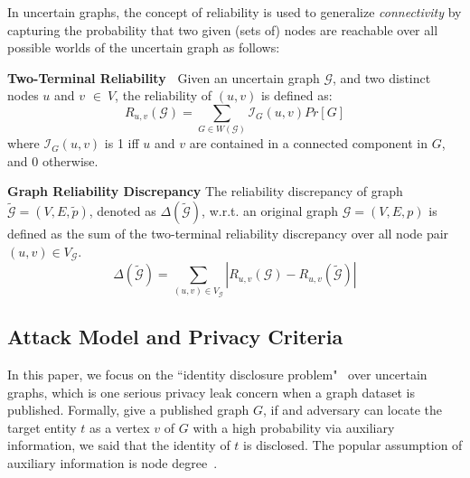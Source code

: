 In uncertain graphs, the concept of reliability is used to generalize \emph{connectivity} by  capturing the probability that two given (sets of) nodes are reachable over all possible worlds of the uncertain graph as follows:
\begin{definition}
    \textbf{Two-Terminal Reliability~\cite{Colbourn_Colbourn_1987}}  Given an uncertain graph $\mathcal{G}$, and two distinct nodes $u$ and $v$  $\in~V$, the reliability of $(u,v)$ is defined as:
        \begin{equation*}
                R_{u,v}(\mathcal{G})= \sum_{G \in W(\mathcal{G})}  \mathcal{I}_{G}(u,v) Pr[G] 
        \end{equation*}
    where $\mathcal{I}_{G}(u,v)$ is 1 iff $u$ and $v$ are contained in a connected component in $G$, and 0 otherwise.   
    \label{d:reliability}
\end{definition}


\theoremstyle{definition}
\begin{definition}
    \textbf{Graph Reliability Discrepancy}
    The reliability discrepancy of graph $\tilde{\mathcal{G}}=(V,E, \tilde{\mathit{p}})$, 
    denoted as $\Delta(\tilde{\mathcal{G}})$, 
    w.r.t. an original graph  $\mathcal{G}=(V,E,\mathit{p})$  is 
    defined as the sum of the two-terminal reliability discrepancy over all node pair $(u,v) \in V_\mathcal{G}$.
    \begin{equation*}
        \Delta(\tilde{\mathcal{G}})=\sum_{(u,v) \in V_\mathcal{G} }|R_{u,v}(\mathcal{G})-R_{u,v}(\tilde{\mathcal{G}})|
    \end{equation*}
\end{definition}


\subsection{Attack Model and Privacy Criteria}
\label{sec:AMPC}
In this paper, we focus on the ``identity disclosure problem"~\cite{Liu_Towards_2008} over uncertain graphs, which is one serious privacy leak concern when a graph dataset is published. Formally, give a published graph $G$, if and adversary can locate the target entity $t$ as a vertex $v$ of $G$ with a high probability via auxiliary information, we said that the identity of $t$ is disclosed. The popular assumption of auxiliary information is node degree~\cite{Liu_Towards_2008}. 

